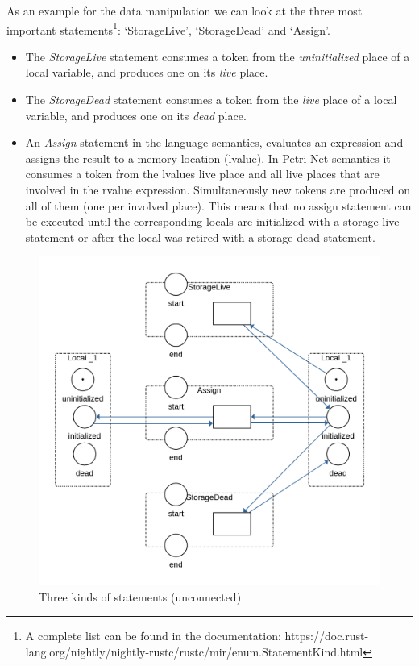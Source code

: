As an example for the data manipulation we can look at the three most important statements\footnote{A complete list can be found in the documentation: https://doc.rust-lang.org/nightly/nightly-rustc/rustc/mir/enum.StatementKind.html}: `StorageLive', `StorageDead' and `Assign'.
\begin{itemize}
    \item The \textit{StorageLive} statement consumes a token from the \textit{uninitialized} place of a local variable, and produces one on its \textit{live} place.
    \item The \textit{StorageDead} statement consumes a token from the \textit{live} place of a local variable, and produces one on its \textit{dead} place.
    \item An \textit{Assign} statement in the language semantics, evaluates an expression and assigns the result to a memory location (lvalue).
    In Petri-Net semantics it consumes a token from the lvalues live place and all live places that are involved in the rvalue expression.
    Simultaneously new tokens are produced on all of them (one per involved place).
    This means that no assign statement can be executed until the corresponding locals are initialized with a storage live statement or after the local was retired with a storage dead statement.
\end{itemize}

\begin{figure}
    \centering
    \includegraphics[width=.6\textwidth]{../diagrams/StatementsNet.png}
    \caption{Three kinds of statements (unconnected)}
    \label{statements_net}
\end{figure}


